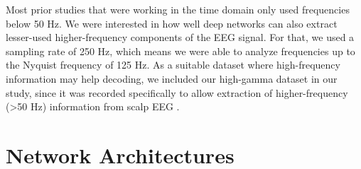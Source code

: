 \documentclass[11pt]{article}
\begin{document}
Most prior studies that were working in the time domain only used
frequencies below 50 Hz. We were interested in how well deep networks
can also extract lesser-used higher-frequency components of the EEG
signal. For that, we used a sampling rate of 250 Hz, which means we were
able to analyze frequencies up to the Nyquist frequency of 125 Hz. As a
suitable dataset where high-frequency information may help decoding, we
included our high-gamma dataset in our study, since it was recorded
specifically to allow extraction of higher-frequency (\textgreater50 Hz)
information from scalp EEG \citep{schirrmeisterdeephbm2017}.

    \hypertarget{network-architectures}{%
\section{Network Architectures}\label{network-architectures}}
\end{document}
